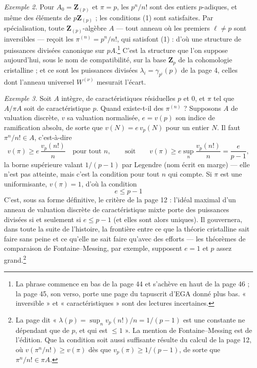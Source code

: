 \documentclass[11pt,a4paper]{article}
\begin{document}
\emph{Exemple 2.} Pour $A_0 = \mathbf{Z}_{(p)}$ et $\pi = p$, les $p^{n}/n!$
sont des entiers $p$-adiques, et même des éléments de $p\mathbf{Z}_{(p)}$ ;
les conditions (1) sont satisfaites. Par spécialisation, toute
$\mathbf{Z}_{(p)}$-algèbre $A$ — tout anneau où les premiers $\ell \neq p$
sont inversibles — reçoit les $\pi^{(n)} = p^{n}/n!$, qui satisfont (1) :
d'où une structure de puissances divisées canonique sur $pA$.\footnote{La
phrase commence en bas de la page 44 et s'achève en haut de la page 46 ; la
page 45, son verso, porte une page du tapuscrit d'EGA donné plus bas.
« inversible » et « caractéristiques » sont des lectures incertaines.} C'est
la structure que l'on suppose aujourd'hui, sous le nom de compatibilité, sur
la base $\mathbf{Z}_p$ de la cohomologie cristalline ; et ce sont les
puissances divisées $\lambda_i = \gamma_{p^{i}}(p)$ de la page 4, celles dont
l'anneau universel $W^{(\nu)}$ mesurait l'écart.

\emph{Exemple 3.} Soit $A$ intègre, de caractéristiques résiduelles $p$ et
$0$, et $\pi$ tel que $A/\pi A$ soit de caractéristique $p$. Quand
existe-t-il des $\pi^{(n)}$ ? Supposons $A$ de valuation discrète, $v$ sa
valuation normalisée, $e = v(p)$ son indice de ramification absolu, de sorte
que $v(N) = e\,v_p(N)$ pour un entier $N$. Il faut $\pi^{n}/n! \in A$,
c'est-à-dire
\[
v(\pi) \geqslant e\,\frac{v_p(n!)}{n} \quad \text{pour tout } n, \qquad
\text{soit} \qquad v(\pi) \geqslant e \sup_n \frac{v_p(n!)}{n} =
\frac{e}{p-1},
\]
la borne supérieure valant $1/(p-1)$ par Legendre (nom écrit en marge) —
elle n'est pas atteinte, mais c'est la condition pour tout $n$ qui compte.
Si $\pi$ est une uniformisante, $v(\pi) = 1$, d'où la condition
\[
\boxed{\ e \leqslant p-1\ }
\]
C'est, sous sa forme définitive, le critère de la page 12 : l'idéal maximal
d'un anneau de valuation discrète de caractéristique mixte porte des
puissances divisées si et seulement si $e \leqslant p - 1$ (et elles sont
alors uniques). Il gouvernera, dans toute la suite de l'histoire, la
frontière entre ce que la théorie cristalline sait faire sans peine et ce
qu'elle ne sait faire qu'avec des efforts — les théorèmes de comparaison de
Fontaine--Messing, par exemple, supposent $e = 1$ et $p$ assez grand.\footnote{La
page dit « $\lambda(p) = \sup_n v_p(n!)/n = 1/(p-1)$ est une constante ne
dépendant que de $p$, et qui est $\leqslant 1$ ». La mention de
Fontaine--Messing est de l'édition. Que la condition soit aussi suffisante
résulte du calcul de la page 12, où $v(\pi^{n}/n!) \geqslant v(\pi)$ dès que
$v_p(\pi) \geqslant 1/(p-1)$, de sorte que $\pi^{n}/n! \in \pi A$.}
\end{document}
